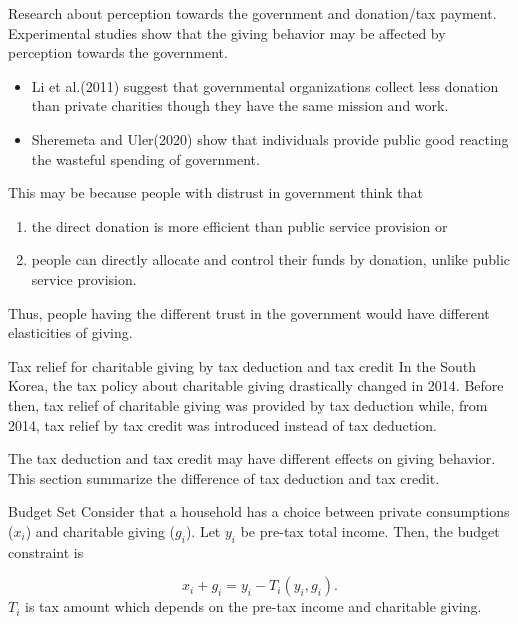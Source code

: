 \documentclass[
  ignorenonframetext,
]{beamer}
\providecommand{\tightlist}{%
  \setlength{\itemsep}{0pt}\setlength{\parskip}{0pt}}
\begin{document}
\begin{frame}{Research about perception towards the government and donation/tax payment.}
\protect\hypertarget{research-about-perception-towards-the-government-and-donationtax-payment.}{}
Experimental studies show that the giving behavior may be affected by perception towards the government.

\begin{itemize}
\tightlist
\item
  Li et al.(2011) suggest that governmental organizations collect less donation than private charities though they have the same mission and work.
\item
  Sheremeta and Uler(2020) show that individuals provide public good reacting the wasteful spending of government.
\end{itemize}

This may be because people with distrust in government think that

\begin{enumerate}
\tightlist
\item
  the direct donation is more efficient than public service provision or
\item
  people can directly allocate and control their funds by donation, unlike public service provision.
\end{enumerate}

Thus, people having the different trust in the government would have different elasticities of giving.
\end{frame}

\begin{frame}{Tax relief for charitable giving by tax deduction and tax credit}
\protect\hypertarget{tax-relief-for-charitable-giving-by-tax-deduction-and-tax-credit}{}
In the South Korea, the tax policy about charitable giving drastically changed in 2014. Before then, tax relief of charitable giving was provided by tax deduction while, from 2014, tax relief by tax credit was introduced instead of tax deduction.

The tax deduction and tax credit may have different effects on giving behavior.
This section summarize the difference of tax deduction and tax credit.
\end{frame}

\begin{frame}{Budget Set}
\protect\hypertarget{budget-set}{}
Consider that a household has a choice between private consumptions (\(x_i\)) and charitable giving (\(g_i\)). Let \(y_i\) be pre-tax total income.
Then, the budget constraint is

\[
    x_i + g_i = y_i - T_i(y_i, g_i).
\]
\(T_i\) is tax amount which depends on the pre-tax income and charitable giving.
\end{frame}
\end{document}

